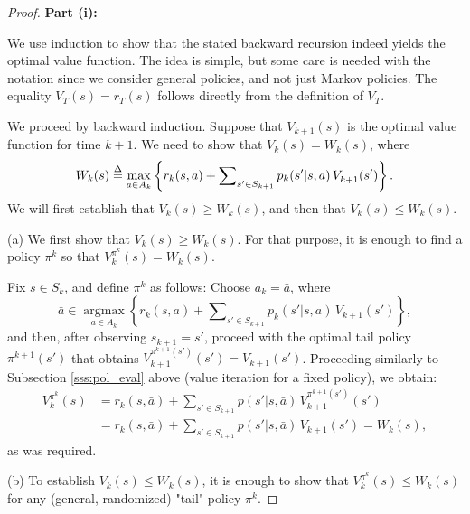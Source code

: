 \begin{proof}
\textbf{Part (i):}

We use induction to show that the stated backward recursion indeed yields the optimal value function. The idea is simple, but some care is needed with the notation since we consider general policies, and not just Markov policies.
The equality $V_T^{}(s) = {r_T}(s)$ follows directly from the definition of $V_T^{}$.

We proceed by backward induction. Suppose that $V_{k + 1}^{}(s)$ is the optimal value function for time $k + 1$. We need to show that $V_k^{}(s) = {W_k}(s)$, where
                       \[{W_k}(s) \buildrel \Delta \over = {\max _{a \in {A_k}}}\left\{ {{r_k}(s,a) + \sum\nolimits_{s' \in {S_{k + 1}}} {{p_k}(s'|s,a)\,} V_{k + 1}^{}(s')} \right\}.\]
We will first establish that $V_k^{}(s) \ge {W_k}(s)$, and then that $V_k^{}(s) \le {W_k}(s)$.

(a) We first show that $V_k^{}(s) \ge {W_k}(s)$. For that purpose, it is enough to find a policy ${\pi ^k}$ so that $V_k^{{\pi ^k}}(s) = {W_k}(s)$.

Fix $s \in {S_k}$, and define ${\pi ^k}$ as follows: Choose ${a_k} = \bar a$, where
\[\bar a \in \mathop {\arg \max }\limits_{a \in {A_k}} \left\{ {{r_k}(s,a) + \sum\nolimits_{s' \in {S_{k + 1}}} {{p_k}(s'|s,a)} \,V_{k + 1}^{}(s')} \right\},\]
and then, after observing  ${s_{k + 1}} = s'$, proceed with the optimal tail policy ${\pi ^{k + 1}}(s')$ that obtains $V_{k + 1}^{{\pi ^{k + 1}}(s')}(s') = {V_{k + 1}}(s')$. Proceeding similarly to Subsection \ref{sss:pol_eval} above (value iteration for a fixed policy), we obtain:
\begin{align}
V_k^{{\pi ^k}}(s) &= {r_k}(s,\bar a) + \sum\nolimits_{s' \in {S_{k + 1}}} {p(s'|s,\bar a)\,} V_{k + 1}^{{\pi ^{k + 1}}(s')}(s')\\
 &= {r_k}(s,\bar a) + \sum\nolimits_{s' \in {S_{k + 1}}} {p(s'|s,\bar a)} \,V_{k + 1}^{}(s') = {W_k}(s),
\end{align}
as was required.

(b) To establish $V_k^{}(s) \le {W_k}(s)$, it is enough to show that $V_k^{{\pi ^k}}(s) \le {W_k}(s)$ for any (general, randomized) "tail" policy ${\pi ^k}$.


\end{proof}
